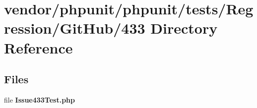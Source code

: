 \section{vendor/phpunit/phpunit/tests/\+Regression/\+Git\+Hub/433 Directory Reference}
\label{dir_ea4349912dda4a7618c72fbafff99449}
\subsection*{Files}
\begin{DoxyCompactItemize}
\item 
file {\bf Issue433\+Test.\+php}
\end{DoxyCompactItemize}

